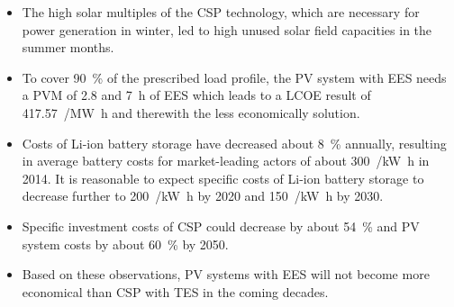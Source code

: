 \begin{itemize}

\item The high solar multiples of the CSP technology, which are necessary for power generation in winter, led to high unused solar field capacities in the summer months.



\item To cover \SI{90}{\percent} of the prescribed load profile, the PV system with EES needs a PVM of \num{2.8} and \SI{7}{\hour} of EES which leads to a LCOE result of \SI{417.57}{\usd/\mega\watt\hour} and therewith the less economically solution.



\item Costs of Li-ion battery storage have decreased about \SI{8}{\percent} annually, resulting in average battery costs for market-leading actors of about \SI{300}{\usd/\kilo\watt\hour} in 2014. It is reasonable to expect specific costs of Li-ion battery storage to decrease further to \SI{200}{\usd/\kilo\watt\hour} by 2020 and \SI{150}{\usd/\kilo\watt\hour} by 2030.


\item Specific investment costs of CSP could decrease by about \SI{54}{\percent} and PV system costs by about \SI{60}{\percent} by 2050.


\item Based on these observations, PV systems with EES will not become more economical than CSP with TES in the coming decades.
\end{itemize}

